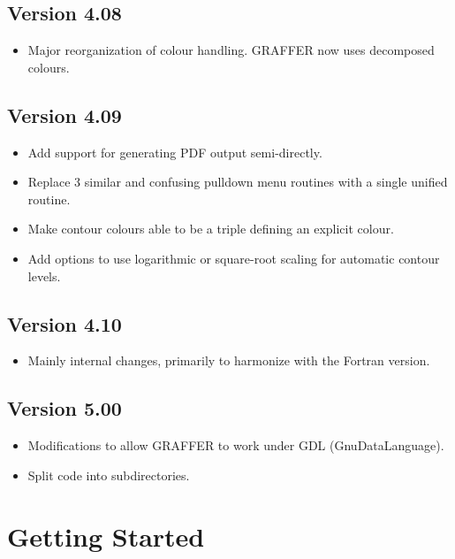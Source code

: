 \documentclass[11pt,twoside,english]{article}
\begin{document}
\subsection{Version 4.08}
\label{sec:v408}

\begin{itemize}
\item Major reorganization of colour handling. GRAFFER now uses
  decomposed colours. 
\end{itemize}

\subsection{Version 4.09}
\label{sec:v409}

\begin{itemize}
\item Add support for generating PDF output semi-directly.
\item Replace 3 similar and confusing pulldown menu routines with a
  single unified routine.
\item Make contour colours able to be a triple defining an explicit
  colour.
\item Add options to use logarithmic or square-root scaling for
  automatic contour levels.
\end{itemize}

\subsection{Version 4.10}
\label{sec:v410}

\begin{itemize}
\item Mainly internal changes, primarily to harmonize with the Fortran
  version.
\end{itemize}

\subsection{Version 5.00}
\label{sec:v500}

\begin{itemize}
\item Modifications to allow GRAFFER to work under GDL
  (GnuDataLanguage).
\item Split code into subdirectories.
\end{itemize}


\section{Getting Started}
\end{document}
